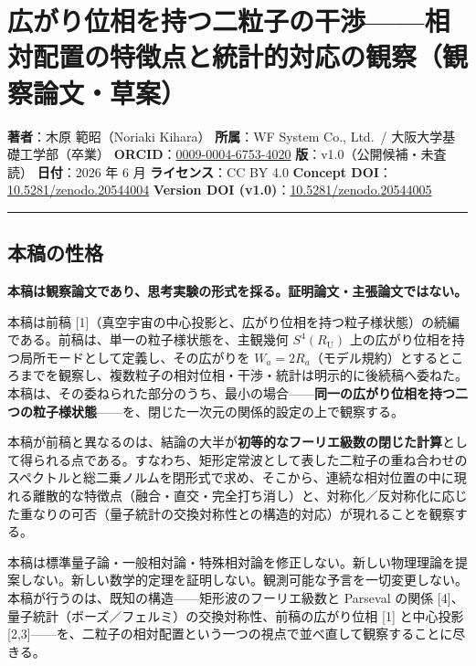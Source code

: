 \documentclass[
]{ltjsarticle}
\author{}
\date{}
\begin{document}
\section{広がり位相を持つ二粒子の干渉------相対配置の特徴点と統計的対応の観察（観察論文・草案）}\label{ux5e83ux304cux308aux4f4dux76f8ux3092ux6301ux3064ux4e8cux7c92ux5b50ux306eux5e72ux6e09ux76f8ux5bfeux914dux7f6eux306eux7279ux5fb4ux70b9ux3068ux7d71ux8a08ux7684ux5bfeux5fdcux306eux89b3ux5bdfux89b3ux5bdfux8ad6ux6587ux8349ux6848}

\textbf{著者}：木原 範昭（Noriaki Kihara） \textbf{所属}：WF System Co.,
Ltd.~/ 大阪大学基礎工学部（卒業）
\textbf{ORCID}：\href{https://orcid.org/0009-0004-6753-4020}{0009-0004-6753-4020}
\textbf{版}：v1.0（公開候補・未査読） \textbf{日付}：2026 年 6 月
\textbf{ライセンス}：CC BY 4.0 \textbf{Concept
DOI}：\href{https://doi.org/10.5281/zenodo.20544004}{10.5281/zenodo.20544004}
\textbf{Version DOI
(v1.0)}：\href{https://doi.org/10.5281/zenodo.20544005}{10.5281/zenodo.20544005}

\begin{center}\rule{0.5\linewidth}{0.5pt}\end{center}

\subsection{本稿の性格}\label{ux672cux7a3fux306eux6027ux683c}

\textbf{本稿は観察論文であり、思考実験の形式を採る。証明論文・主張論文ではない。}

本稿は前稿
{[}1{]}（真空宇宙の中心投影と、広がり位相を持つ粒子様状態）の続編である。前稿は、単一の粒子様状態を、主観幾何
\(S^4(R_{\mathrm U})\)
上の広がり位相を持つ局所モードとして定義し、その広がりを
\(W_a=2R_a\)（モデル規約）とするところまでを観察し、複数粒子の相対位相・干渉・統計は明示的に後続稿へ委ねた。本稿は、その委ねられた部分のうち、最小の場合------\textbf{同一の広がり位相を持つ二つの粒子様状態}------を、閉じた一次元の関係的設定の上で観察する。

本稿が前稿と異なるのは、結論の大半が\textbf{初等的なフーリエ級数の閉じた計算}として得られる点である。すなわち、矩形定常波として表した二粒子の重ね合わせのスペクトルと総二乗ノルムを閉形式で求め、そこから、連続な相対位置の中に現れる離散的な特徴点（融合・直交・完全打ち消し）と、対称化／反対称化に応じた重なりの可否（量子統計の交換対称性との構造的対応）が現れることを観察する。

本稿は標準量子論・一般相対論・特殊相対論を修正しない。新しい物理理論を提案しない。新しい数学的定理を証明しない。観測可能な予言を一切変更しない。本稿が行うのは、既知の構造------矩形波のフーリエ級数と
Parseval の関係
{[}4{]}、量子統計（ボーズ／フェルミ）の交換対称性、前稿の広がり位相
{[}1{]} と中心投影
{[}2,3{]}------を、二粒子の相対配置という一つの視点で並べ直して観察することに尽きる。
\end{document}
